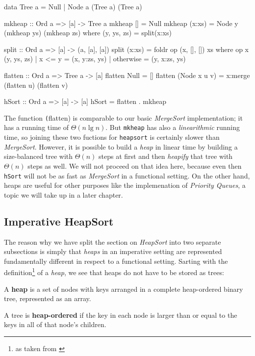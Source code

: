\begin{haskellcode}
data Tree a = Null | Node a (Tree a) (Tree a)

mkheap :: Ord a => [a] -> Tree a
mkheap [] = Null
mkheap (x:xs) = Node y (mkheap ys) (mkheap zs)
    where (y, ys, zs) = split(x:xs)

split :: Ord a => [a] -> (a, [a], [a])
split (x:xs) = foldr op (x, [], []) xs
    where op x (y, ys, zs) | x <= y    = (x, y:zs, ys)
                           | otherwise = (y, x:zs, ys)

flatten :: Ord a => Tree a -> [a]
flatten Null = []
flatten (Node x u v) = x:merge (flatten u) (flatten v)

hSort :: Ord a => [a] -> [a]
hSort = flatten . mkheap
\end{haskellcode}

The function \texttt(flatten) is comparable to our basic \emph{MergeSort} implementation; it has a running time of $\Theta(n \lg n)$.
But \texttt{mkheap} has also a \emph{linearithmic} running time, so joining these two fuctions for \texttt{heapsort} is certainly slower than \emph{MergeSort}.
However, it is possible to build a \emph{heap} in linear time by building a size-balanced tree with $\Theta(n)$ steps at first and then \emph{heapify} that tree with $\Theta(n)$ steps as well.
We will not proceed on that idea here, because even then \texttt{hSort} will not be as fast as \emph{MergeSort} in a functional setting.
On the other hand, heaps are useful for other purposes like the implemenation of \emph{Priority Queues}, a topic we will take up in a later chapter.

\subsection{Imperative HeapSort}

The reason why we have split the section on \emph{HeapSort} into two separate subsections is simply that \emph{heaps} in an imperative setting are represented fundamentally different in respect to a functional setting.
Sarting with the definition\footnote{as taken from \autocite[section 9.2][]{algsc98}} of a \emph{heap}, we see that heaps do not have to be stored as trees:

\begin{defn}[Heap]
A \textbf{heap} is a set of nodes with keys arranged in a complete heap-ordered binary tree, represented as an array.
\end{defn}

\begin{defn}
A tree is \textbf{heap-ordered} if the key in each node is larger than or equal to the keys in all of that node's children.
\end{defn}

